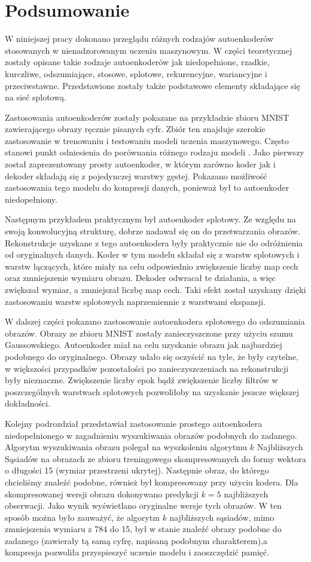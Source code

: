 \documentclass[12pt]{mwbk}
\theoremstyle{plain}
\theoremstyle{definition}
\theoremstyle{remark}
\begin{document}
\chapter*{Podsumowanie}

W niniejszej pracy dokonano przeglądu różnych rodzajów autoenkoderów stosowanych w nienadzorowanym uczeniu maszynowym. W części teoretycznej zostały opisane takie rodzaje autoenkoderów jak niedopełnione, rzadkie, kurczliwe, odszumiające, stosowe, splotowe, rekurencyjne, wariancyjne i przeciwstawne. Przedstawione zostały także podstawowe elementy składające się na sieć splotową.

Zastosowania autoenkoderów zostały pokazane na przykładzie zbioru MNIST zawierającego obrazy ręcznie pisanych cyfr. Zbiór ten znajduje szerokie zastosowanie w trenowaniu i testowaniu modeli uczenia maszynowego. Często stanowi punkt odniesienia do porównania różnego rodzaju modeli \cite{benchmark}. Jako pierwszy został zaprezentowany prosty autoenkoder, w którym zarówno koder jak i dekoder składają się z pojedynczej warstwy gęstej. Pokazano możliwość zastosowania tego modelu do kompresji danych, ponieważ był to autoenkoder niedopełniony. 

Następnym przykładem praktycznym był autoenkoder splotowy. Ze względu na swoją konwolucyjną strukturę, dobrze nadawał się on do przetwarzania obrazów. Rekonstrukcje uzyskane z tego autoenkodera były praktycznie nie do odróżnienia od oryginalnych danych. Koder w tym modelu składał się z warstw splotowych i warstw łączących, które miały na celu odpowiednio zwiększenie liczby map cech oraz zmniejszenie wymiaru obrazu. Dekoder odwracał te działania, a więc zwiększał wymiar, a zmniejszał liczbę map cech. Taki efekt został uzyskany dzięki zastosowaniu warstw splotowych naprzemiennie z warstwami ekspansji.

W dalszej części pokazano zastosowanie autoenkodera splotowego do odszumiania obrazów. Obrazy ze zbioru MNIST zostały zanieczyszczone przy użyciu szumu Gaussowskiego. Autoenkoder miał na celu uzyskanie obrazu jak najbardziej podobnego do oryginalnego. Obrazy udało się oczyścić na tyle, że były czytelne, w większości przypadków pozostałości po zanieczyszczeniach na rekonstrukcji były nieznaczne. Zwiększenie liczby epok bądź zwiększenie liczby filtrów w poszczególnych warstwach splotowych pozwoliłoby na uzyskanie jeszcze większej dokładności.

Kolejny podrozdział przedstawiał zastosowanie prostego autoenkodera niedopełnionego w zagadnieniu wyszukiwania obrazów podobnych do zadanego. Algorytm wyszukiwania obrazu polegał na wyszkoleniu algorytmu $k$ Najbliższych Sąsiadów na obrazach ze zbioru treningowego skompresowanych do formy wektora o długości 15 (wymiar przestrzeni ukrytej). Następnie obraz, do którego chcieliśmy znaleźć podobne, również był kompresowany przy użyciu kodera. Dla skompresowanej wersji obrazu dokonywano predykcji $k=5$ najbliższych obserwacji. Jako wynik wyświetlano oryginalne wersje tych obrazów. W ten sposób można było zauważyć, że algorytm $k$ najbliższych sąsiadów, mimo zmniejszenia wymiaru z 784 do 15, był w stanie znaleźć obrazy podobne do zadanego (zawierały tą samą cyfrę, napisaną podobnym charakterem),a  kompresja pozwoliła przyspieszyć uczenie modelu i zaoszczędzić pamięć.
\end{document}
